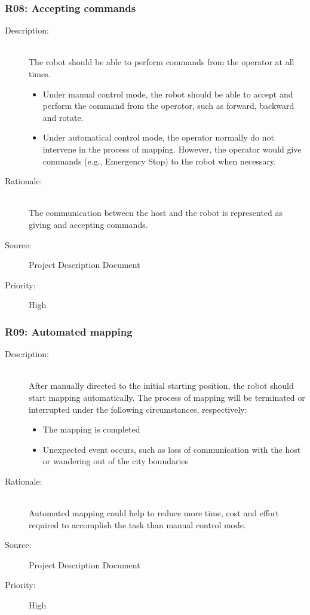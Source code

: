 \documentclass[titlepage]{article}
\begin{document}
\subsubsection{R08: Accepting commands }
\begin{description}
\item[Description: ] \hfill \\ The robot should be able to perform commands from the operator at all times. 

\begin{itemize}
\item Under manual control mode, the robot should be able to accept and perform the command from the operator, such as forward, backward and rotate.
\item Under automatical control mode, the operator normally do not intervene in the process of mapping. However, the operator would give commands (e.g., Emergency Stop) to the robot when necessary.
\end{itemize}

\item[Rationale: ] \hfill \\The communication between the host and the robot is represented as giving and accepting commands.
\item[Source: ] Project Description Document 
\item[Priority: ] High
\end{description}



\subsubsection{R09: Automated mapping }
\begin{description}
\item[Description: ] \hfill \\After manually directed to the initial starting position, the robot should start mapping automatically. The process of mapping will be terminated or interrupted under the following circumstances, respectively:
\begin{itemize}
\item The mapping is completed
\item Unexpected event occurs, such as loss of communication with the host or wandering out of the city boundaries
\end{itemize}
\item[Rationale: ] \hfill \\ Automated mapping could help to reduce more time, cost and effort required to accomplish the task than manual control mode.
\item[Source: ] Project Description Document 
\item[Priority: ] High
\end{description}
\end{document}
